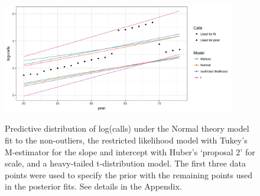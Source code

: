 \documentclass[12pt]{article}
\def\bth{\mbox{\boldmath $\theta$}}
\newcommand{\by}{\mbox{\boldmath $y$}}
\begin{document}
\begin{figure}
\centering
{\includegraphics[width = 4in]{figs/calls_predictive.png}}
\caption{Predictive distribution of log(calls) under the Normal theory model fit to the non-outliers, the restricted likelihood model with  Tukey's M-estimator for the slope and intercept with Huber's `proposal 2'  for scale, and a heavy-tailed t-distribution model. The first three data points were used to specify the prior with the remaining points used in the posterior fits. See details in the Appendix.}
\label{fig:calls_predictive}
\end{figure}


%
%
\end{document}
